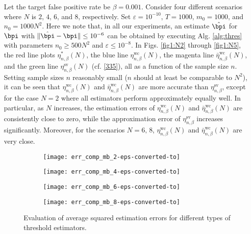 \documentclass[10pt, twocolumn]{IEEEtran}
\begin{document}
Let the target false positive rate be $\beta = 0.001$. Consider four
different scenarios where $N$ is $2$, $4$, $6$, and $8$,
respectively. Set $\varepsilon = 10^{-10}$, $T = 1000$, $m_0 = 1000$,
and $n_0 = 1000N^2$. {Here we note that, in all our experiments, an
  estimate $\hat \bpi$ for $\bpi$ with $\|\hat \bpi - \bpi\| \le
  10^{-6}$ can be obtained by executing Alg. \ref{alg:thres} with
  parameters $n_0 \ge 500N^2$ and $\varepsilon \le 10^{-8}$.} In
Figs. \ref{fig1:N2} through \ref{fig1:N5}, the red line plots
$\eta^{*}_{n,\beta}(N)$, the blue line $\eta_{n,\beta}^{\text{wc}}(N)$,
the magenta line $\bar \eta_{n,\beta}^{\text{wc}}(N)$, and the green
line $\eta_{n,\beta}^{\text{sv}}(N)$ (cf. \eqref{335}), all as a
function of the sample size $n$. Setting sample sizes $n$ reasonably
small ($n$ should at least be comparable to $N^2$), it can be seen that
$\eta_{n,\beta}^{\text{wc}}(N)$ and $\bar \eta_{n,\beta}^{\text{wc}}(N)$
are more accurate than $\eta_{n,\beta}^{\text{sv}}$, except for the case
$N = 2$ where all estimators perform approximately equally well. In
particular, as $N$ increases, the estimation errors of
$\eta_{n,\beta}^{\text{wc}}(N)$ and $\bar \eta_{n,\beta}^{\text{wc}}(N)$
are consistently close to zero, while the approximation error of
$\eta_{n,\beta}^{\text{sv}}$ increases significantly. Moreover, for the
scenarios $N = 6, \,8$, $\eta_{n,\beta}^{\text{wc}}(N)$ and $\bar
\eta_{n,\beta}^{\text{wc}}(N)$ are very close.


\begin{figure*}[thpb]  
	\centering
	\begin{subfigure}[b]{0.495\textwidth}
		\texttt{[image: err\_comp\_mb\_2-eps-converted-to]} 
		\caption{}
		\label{fig1:errN2}
	\end{subfigure} 
	\begin{subfigure}[b]{0.495\textwidth}
		\texttt{[image: err\_comp\_mb\_4-eps-converted-to]}
		\caption{}
		\label{fig1:errN4}
	\end{subfigure}   
	\begin{subfigure}[b]{0.495\textwidth}
		\texttt{[image: err\_comp\_mb\_6-eps-converted-to]}
		\caption{}
		\label{fig1:errN6}
	\end{subfigure}  
	\begin{subfigure}[b]{0.495\textwidth}
		\texttt{[image: err\_comp\_mb\_8-eps-converted-to]}
		\caption{}
		\label{fig1:errN8}
	\end{subfigure}  
	\caption{Evaluation of average squared estimation errors for different types of threshold estimators.}
	\label{fig1:errN2468}
\end{figure*}
\end{document}
